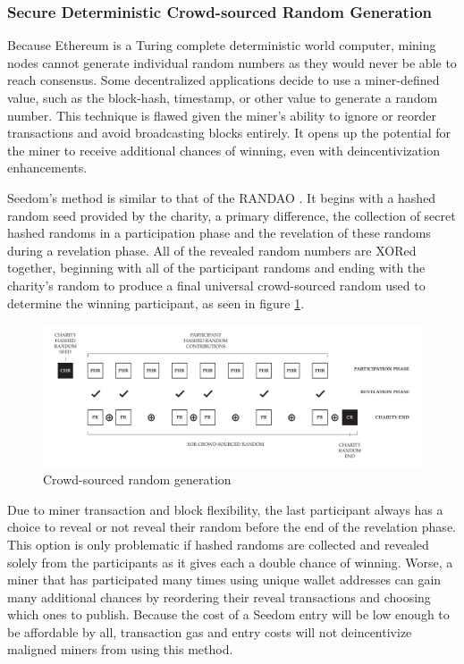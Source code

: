 \documentclass[11pt]{article}
\begin{document}
\subsubsection{Secure Deterministic Crowd-sourced Random Generation}
\label{secureDeterministicCrowdSourcedRandomGeneration}

Because Ethereum is a Turing complete deterministic world computer, mining nodes cannot generate individual random numbers as they would never be able to reach consensus. Some decentralized applications decide to use a miner-defined value, such as the block-hash, timestamp, or other value to generate a random number. This technique is flawed given the miner's ability to ignore or reorder transactions and avoid broadcasting blocks entirely. It opens up the potential for the miner to receive additional chances of winning, even with deincentivization enhancements.

Seedom's method is similar to that of the RANDAO \cite{2}. It begins with a hashed random seed provided by the charity, a primary difference, the collection of secret hashed randoms in a participation phase and the revelation of these randoms during a revelation phase. All of the revealed random numbers are XORed together, beginning with all of the participant randoms and ending with the charity's random to produce a final universal crowd-sourced random used to determine the winning participant, as seen in figure \ref{figure:crowdsourcedRandomGeneration}.

\begin{figure}[H]
\begin{center}
\includegraphics[width=1.0\textwidth]{./graphics/crowdsourcedRandomGeneration.pdf}
\caption{Crowd-sourced random generation}
\label{figure:crowdsourcedRandomGeneration}
\end{center}
\end{figure}

Due to miner transaction and block flexibility, the last participant always has a choice to reveal or not reveal their random before the end of the revelation phase. This option is only problematic if hashed randoms are collected and revealed solely from the participants as it gives each a double chance of winning. Worse, a miner that has participated many times using unique wallet addresses can gain many additional chances by reordering their reveal transactions and choosing which ones to publish. Because the cost of a Seedom entry will be low enough to be affordable by all, transaction gas and entry costs will not deincentivize maligned miners from using this method.
\end{document}
